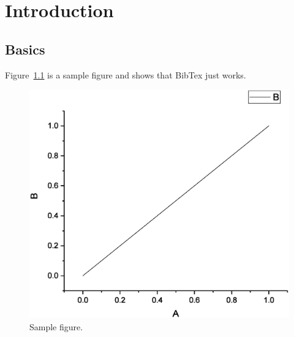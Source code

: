 \chapter{Introduction}

\section{Basics}

Figure~\ref{fig:intro} is a sample figure and \citet{1998SSRv...84..327C} shows that BibTex just works. 

\begin{figure}
\centering
\includegraphics[width=\textwidth]{intro.eps}
\caption{Sample figure.}
\label{fig:intro}
\end{figure}




